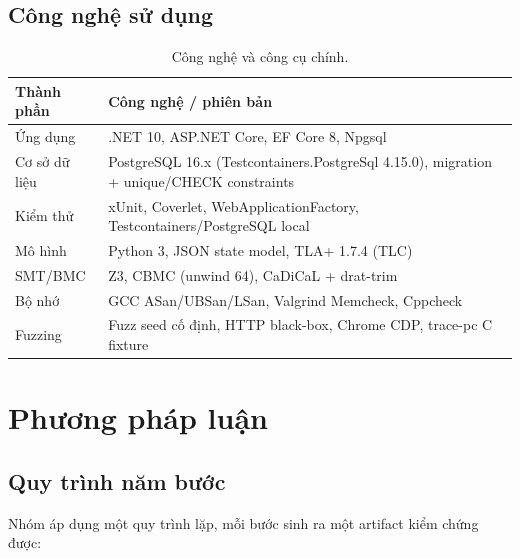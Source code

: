 \documentclass[12pt,a4paper]{article}
\begin{document}
\subsection{Công nghệ sử dụng}
\begin{table}[H]
\centering
\small
\renewcommand{\arraystretch}{1.2}
\begin{tabularx}{\textwidth}{@{}L{4.2cm} Y@{}}
\toprule
\textbf{Thành phần} & \textbf{Công nghệ / phiên bản} \\
\midrule
Ứng dụng & .NET 10, ASP.NET Core, EF Core 8, Npgsql \\
Cơ sở dữ liệu & PostgreSQL 16.x (Testcontainers.PostgreSql 4.15.0), migration + unique/CHECK constraints \\
Kiểm thử & xUnit, Coverlet, WebApplicationFactory, Testcontainers/PostgreSQL local \\
Mô hình & Python 3, JSON state model, TLA+ 1.7.4 (TLC) \\
SMT/BMC & Z3, CBMC (unwind 64), CaDiCaL + drat-trim \\
Bộ nhớ & GCC ASan/UBSan/LSan, Valgrind Memcheck, Cppcheck \\
Fuzzing & Fuzz seed cố định, HTTP black-box, Chrome CDP, trace-pc C fixture \\
\bottomrule
\end{tabularx}
\caption{Công nghệ và công cụ chính.}
\end{table}

\section{Phương pháp luận}

\subsection{Quy trình năm bước}
Nhóm áp dụng một quy trình lặp, mỗi bước sinh ra một artifact kiểm chứng được:
\end{document}
